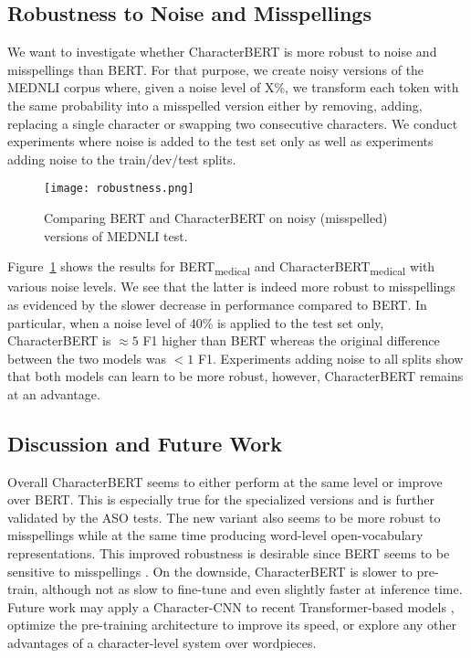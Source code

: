 \documentclass[11pt]{article}
\begin{document}
\subsection{Robustness to Noise and Misspellings}

We want to investigate whether CharacterBERT is more robust to noise and misspellings than BERT. For that purpose, we create noisy versions of the MEDNLI corpus where, given a noise level of X\%, we transform each token with the same probability into a misspelled version either by removing, adding, replacing a single character or swapping two consecutive characters. We conduct experiments where noise is added to the test set only as well as experiments adding noise to the train/dev/test splits.

\begin{figure}[htpb]
\begin{center} 
\texttt{[image: robustness.png]}
\end{center} 
\caption{Comparing BERT and CharacterBERT on noisy (misspelled) versions of MEDNLI test.} \label{robustness}
\end{figure}

Figure~\ref{robustness} shows the results for BERT\textsubscript{medical} and CharacterBERT\textsubscript{medical} with various noise levels. We see that the latter is indeed more robust to misspellings as evidenced by the slower decrease in performance compared to BERT. In particular, when a noise level of 40\% is applied to the test set only, CharacterBERT is $\approx 5$ F1 higher than BERT whereas the original difference between the two models was $< 1$ F1. Experiments adding noise to all splits show that both models can learn to be more robust, however, CharacterBERT remains at an advantage.

\subsection{Discussion and Future Work}

Overall CharacterBERT seems to either perform at the same level or improve over BERT. This is especially true for the specialized versions and is further validated by the ASO tests. The new variant also seems to be more robust to misspellings while at the same time producing word-level open-vocabulary representations. This improved robustness is desirable since BERT seems to be sensitive to misspellings \cite{pruthi-etal-2019-combating,sun2020adv}. On the downside, CharacterBERT is slower to pre-train, although not as slow to fine-tune and even slightly faster at inference time. Future work may apply a Character-CNN to recent Transformer-based models \cite{lan2019albert,sun2019ernie}, optimize the pre-training architecture to improve its speed, or explore any other advantages of a character-level system over wordpieces.
\end{document}
